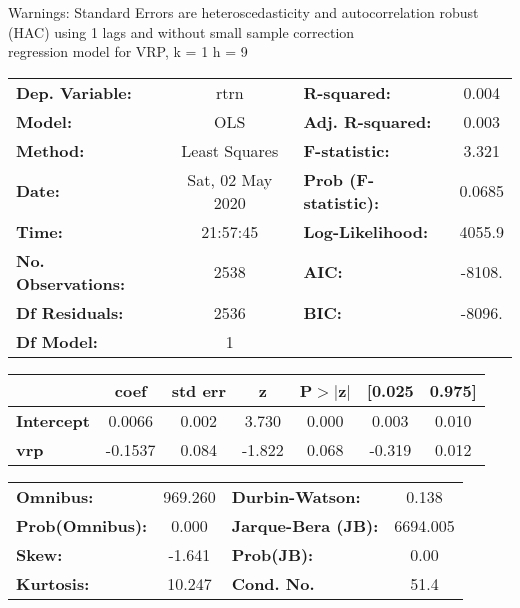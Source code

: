 Warnings: \newline
 [1] Standard Errors are heteroscedasticity and autocorrelation robust (HAC) using 1 lags and without small sample correction\\ 

regression model for VRP, k = 1 h = 9\begin{center}
\begin{tabular}{lclc}
\toprule
\textbf{Dep. Variable:}    &       rtrn       & \textbf{  R-squared:         } &     0.004   \\
\textbf{Model:}            &       OLS        & \textbf{  Adj. R-squared:    } &     0.003   \\
\textbf{Method:}           &  Least Squares   & \textbf{  F-statistic:       } &     3.321   \\
\textbf{Date:}             & Sat, 02 May 2020 & \textbf{  Prob (F-statistic):} &   0.0685    \\
\textbf{Time:}             &     21:57:45     & \textbf{  Log-Likelihood:    } &    4055.9   \\
\textbf{No. Observations:} &        2538      & \textbf{  AIC:               } &    -8108.   \\
\textbf{Df Residuals:}     &        2536      & \textbf{  BIC:               } &    -8096.   \\
\textbf{Df Model:}         &           1      & \textbf{                     } &             \\
\bottomrule
\end{tabular}
\begin{tabular}{lcccccc}
                   & \textbf{coef} & \textbf{std err} & \textbf{z} & \textbf{P$> |$z$|$} & \textbf{[0.025} & \textbf{0.975]}  \\
\midrule
\textbf{Intercept} &       0.0066  &        0.002     &     3.730  &         0.000        &        0.003    &        0.010     \\
\textbf{vrp}       &      -0.1537  &        0.084     &    -1.822  &         0.068        &       -0.319    &        0.012     \\
\bottomrule
\end{tabular}
\begin{tabular}{lclc}
\textbf{Omnibus:}       & 969.260 & \textbf{  Durbin-Watson:     } &    0.138  \\
\textbf{Prob(Omnibus):} &   0.000 & \textbf{  Jarque-Bera (JB):  } & 6694.005  \\
\textbf{Skew:}          &  -1.641 & \textbf{  Prob(JB):          } &     0.00  \\
\textbf{Kurtosis:}      &  10.247 & \textbf{  Cond. No.          } &     51.4  \\
\bottomrule
\end{tabular}
\end{center}

